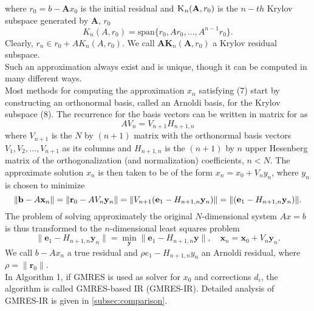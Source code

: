 where $r_0=b-\textbf{A}x_0$ is the initial residual and $\textsc{K}_n(\textbf{A},r_0)$ is the $n-th$ Krylov subspace generated by \textbf{A}, $r_0$
\begin{equation}
    K_n(A, r_0) = \text{span}\{r_0, Ar_0, \dots, A^{n-1}r_0\}.
\end{equation}
Clearly, $r_n \in r_0 + A K_n(A, r_0)$. We call $\textbf{AK}_{n}(\textbf{A},r_0)$ a Krylov residual subspace. \\
Such an approximation always exist and is unique, though it can be computed in many different ways. \\
Most methods for computing the approximation $x_n$ satisfying (7) start by constructing an orthonormal basis, called an Arnoldi basis, for the Krylov subspace  (8). The recurrence for the basis vectors can be written in matrix for as 
\begin{equation}
    AV_n=V_{n+1}H_{n+1,n}
\end{equation}
where $V_{n+1}$ is the $N$ by $(n+1)$ matrix with the orthonormal basis vectors $V_1,V_2,\dots,V_{n+1}$ as its columns and $H_{n+1,n}$ is the $(n+1)$ by $n$ upper Hesenberg matrix of the orthogonalization (and normalization) coefficients, $n<N$. 
The approximate solution $x_n$ is then taken to be of the form $x_n=x_0+V_ny_n$, where $y_n$ is chosen to minimize
\begin{equation}
    \| \mathbf{b} - A\mathbf{x}_n \| = \| \mathbf{r}_0 - AV_n\mathbf{y}_n \| \\
= \| V_{n+1}(\mathbf{e}_1 - H_{n+1,n}\mathbf{y}_n) \| \\
= \| (\mathbf{e}_1 - H_{n+1,n}\mathbf{y}_n) \|.
\end{equation}
The problem of solving approximately the original $N$-dimensional system $Ax=b$ is thus transformed to the $n$-dimensional least squares problem
\begin{equation}
    \| \mathbf{e}_1 - H_{n+1,n}\mathbf{y}_n \| = \min_{\mathbf{y}} \| \mathbf{e}_1 - H_{n+1,n}\mathbf{y} \|, \quad \mathbf{x}_n = \mathbf{x}_0 + V_n\mathbf{y}_n.
\end{equation}
We call $b-Ax_n$ a true residual and $\rho e_1 - H_{n+1,n}y_n$ an Arnoldi residual, where $\rho = \|\mathbf{r}_0\|$.\\

In Algorithm 1, if GMRES is used as solver for $x_0$ and corrections $d_i$, the algorithm is called GMRES-based IR (GMRES-IR). Detailed analysis of GMRES-IR is given in \ref{subsec:comparison}.


